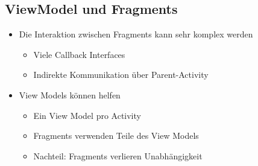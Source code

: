 \subsection{ViewModel und Fragments}
\begin{itemize}[topsep=0pt, leftmargin=4mm]
    \setlength\itemsep{-0.3em}
    \item Die Interaktion zwischen Fragments kann sehr komplex werden
    \begin{itemize}[topsep=0pt, leftmargin=4mm]
        \setlength\itemsep{-0.3em}
        \item Viele Callback Interfaces
        \item Indirekte Kommunikation über Parent-Activity
    \end{itemize}
    \item View Models können helfen
    \begin{itemize}[topsep=0pt, leftmargin=4mm]
        \setlength\itemsep{-0.3em}
        \item Ein View Model pro Activity
        \item Fragments verwenden Teile des View Models
        \item Nachteil: Fragments verlieren Unabhängigkeit
    \end{itemize}
\end{itemize}